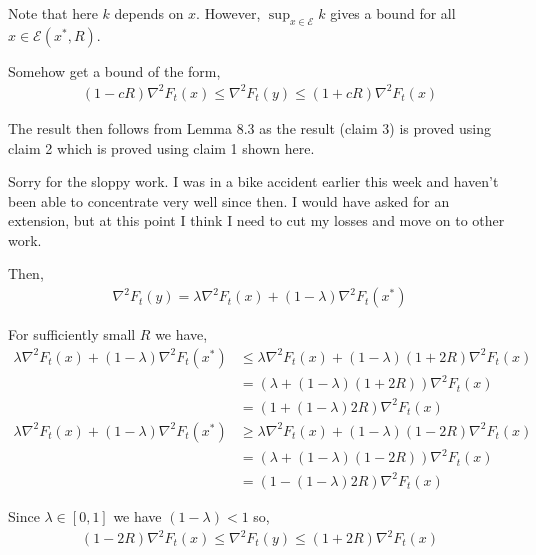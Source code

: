 \documentclass[10pt]{article}
\begin{document}
\begin{solution}
\begin{enumerate}
        Note that here \( k \) depends on \( x \). However, \( \sup_{x\in \mathcal{E}} k \) gives a bound for all \( x\in \mathcal{E} (x^*,R) \).

        Somehow get a bound of the form,
        \begin{align*}
            (1-c R) \nabla^2 F_t(x) \leq \nabla^2 F_t(y) \leq (1+cR)\nabla^2 F_t(x) 
        \end{align*}
        

        The result then follows from Lemma 8.3 as the result (claim 3) is proved using claim 2 which is proved using claim 1 shown here.

        Sorry for the sloppy work. I was in a bike accident earlier this week and haven't been able to concentrate very well since then. I would have asked for an extension, but at this point I think I need to cut my losses and move on to other work.
        
        \iffalse
        Then,
        \begin{align*}
            \nabla^2 F_t(y) 
            = \lambda \nabla^2 F_t(x) + (1-\lambda) \nabla^2 F_t(x^*)
        \end{align*}
        
        For sufficiently small \( R \) we have,
        \begin{align*}
            \lambda \nabla^2 F_t(x) + (1-\lambda) \nabla^2 F_t(x^*)
            &\leq \lambda \nabla^2 F_t(x) + (1-\lambda)(1+2R) \nabla^2F_t(x)
            \\ &= (\lambda + (1-\lambda)(1+2R))\nabla^2F_t(x)
            \\ &= (1 + (1-\lambda)2R)\nabla^2F_t(x)
        \end{align*}   
        \begin{align*}
            \lambda \nabla^2 F_t(x) + (1-\lambda) \nabla^2 F_t(x^*)
            &\geq \lambda \nabla^2 F_t(x) + (1-\lambda)(1-2R) \nabla^2F_t(x)
            \\ &= (\lambda + (1-\lambda)(1-2R))\nabla^2F_t(x)
            \\ &= (1 - (1-\lambda)2R)\nabla^2F_t(x)
        \end{align*}

        Since \( \lambda\in[0,1] \) we have \( (1-\lambda) < 1 \) so,
        \begin{align*}
            (1-2R)\nabla^2F_t(x) \leq \nabla^2 F_t(y) \leq (1+2R)\nabla^2 F_t(x) 
        \end{align*}
        

\end{enumerate}
\end{solution}
\end{document}
